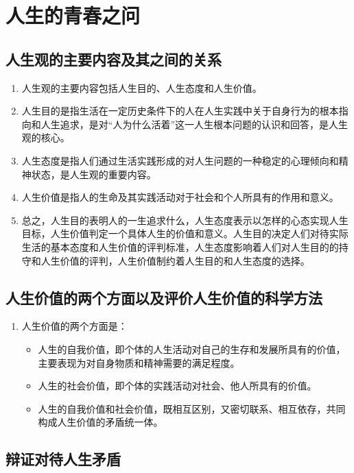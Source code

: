 
\section{人生的青春之问}
\subsection{人生观的主要内容及其之间的关系}
\begin{enumerate}
\item 人生观的主要内容包括人生目的、人生态度和人生价值。
\item 人生目的是指生活在一定历史条件下的人在人生实践中关于自身行为的根本指向和人生追求，是对“人为什么活着”这一人生根本问题的认识和回答，是人生观的核心。
\item 人生态度是指人们通过生活实践形成的对人生问题的一种稳定的心理倾向和精神状态，是人生观的重要内容。
\item 人生价值是指人的生命及其实践活动对于社会和个人所具有的作用和意义。
\item 总之，人生目的表明人的一生追求什么，人生态度表示以怎样的心态实现人生目标，人生价值判定一个具体人生的价值和意义。人生目的决定人们对待实际生活的基本态度和人生价值的评判标准，人生态度影响着人们对人生目的的持守和人生价值的评判，人生价值制约着人生目的和人生态度的选择。
\end{enumerate}
\subsection{人生价值的两个方面以及评价人生价值的科学方法}
\begin{enumerate}
\item 人生价值的两个方面是：
\begin{itemize}
\item 人生的自我价值，即个体的人生活动对自己的生存和发展所具有的价值，主要表现为对自身物质和精神需要的满足程度。
\item 人生的社会价值，即个体的实践活动对社会、他人所具有的价值。
\item 人生的自我价值和社会价值，既相互区别，又密切联系、相互依存，共同构成人生价值的矛盾统一体。
\end{itemize}

\end{enumerate}
\subsection{辩证对待人生矛盾}


